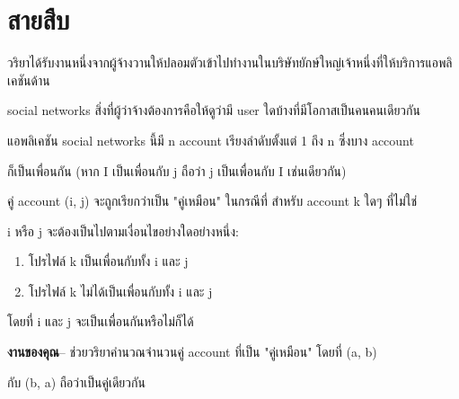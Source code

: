 \documentclass{article}
\begin{document}
\section*{สายสืบ}

วริยาได้รับงานหนึ่งจากผู้จ้างวานให้ปลอมตัวเข้าไปทำงานในบริษัทยักษ์ใหญ่เจ้าหนึ่งที่ให้บริการแอพลิเคชันด้าน

social networks สิ่งที่ผู้ว่าจ้างต้องการคือให้ดูว่ามี user ใดบ้างที่มีโอกาสเป็นคนคนเดียวกัน



แอพลิเคชัน social networks นี้มี n account เรียงลำดับตั้งแต่ 1 ถึง n ซึ่งบาง account

ก็เป็นเพื่อนกัน (หาก I เป็นเพื่อนกับ j ถือว่า j เป็นเพื่อนกับ I เช่นเดียวกัน)



คู่ account (i, j) จะถูกเรียกว่าเป็น "คู่เหมือน" ในกรณีที่ สำหรับ account k ใดๆ ที่ไม่ใช่

i หรือ j จะต้องเป็นไปตามเงื่อนไขอย่างใดอย่างหนึ่ง:



\begin{enumerate}

\tightlist

\item

  โปรไฟล์ k เป็นเพื่อนกับทั้ง i และ j

\item

  โปรไฟล์ k ไม่ได้เป็นเพื่อนกับทั้ง i และ j

\end{enumerate}



โดยที่ i และ j จะเป็นเพื่อนกันหรือไม่ก็ได้



\textbf{งานของคุณ}-- ช่วยวริยาคำนวณจำนวนคู่ account ที่เป็น "คู่เหมือน" โดยที่ (a, b)

กับ (b, a) ถือว่าเป็นคู่เดียวกัน
\end{document}
